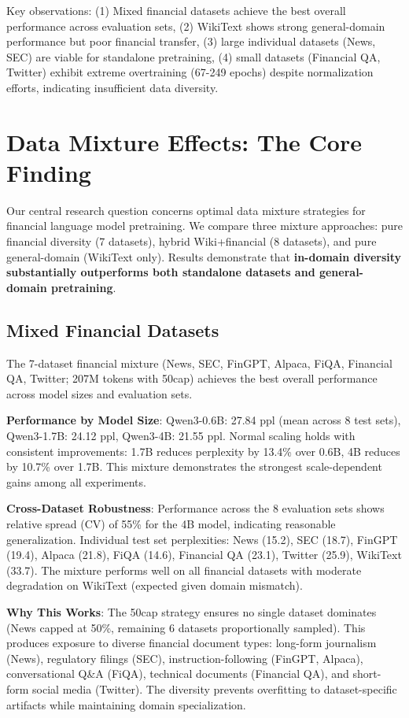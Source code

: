 Key observations: (1) Mixed financial datasets achieve the best overall performance across evaluation sets, (2) WikiText shows strong general-domain performance but poor financial transfer, (3) large individual datasets (News, SEC) are viable for standalone pretraining, (4) small datasets (Financial QA, Twitter) exhibit extreme overtraining (67-249 epochs) despite normalization efforts, indicating insufficient data diversity.

\section{Data Mixture Effects: The Core Finding}

Our central research question concerns optimal data mixture strategies for financial language model pretraining. We compare three mixture approaches: pure financial diversity (7 datasets), hybrid Wiki+financial (8 datasets), and pure general-domain (WikiText only). Results demonstrate that \textbf{in-domain diversity substantially outperforms both standalone datasets and general-domain pretraining}.

\subsection{Mixed Financial Datasets}

The 7-dataset financial mixture (News, SEC, FinGPT, Alpaca, FiQA, Financial QA, Twitter; 207M tokens with 50cap) achieves the best overall performance across model sizes and evaluation sets.

\textbf{Performance by Model Size}: Qwen3-0.6B: 27.84 ppl (mean across 8 test sets), Qwen3-1.7B: 24.12 ppl, Qwen3-4B: 21.55 ppl. Normal scaling holds with consistent improvements: 1.7B reduces perplexity by 13.4\% over 0.6B, 4B reduces by 10.7\% over 1.7B. This mixture demonstrates the strongest scale-dependent gains among all experiments.

\textbf{Cross-Dataset Robustness}: Performance across the 8 evaluation sets shows relative spread (CV) of 55\% for the 4B model, indicating reasonable generalization. Individual test set perplexities: News (15.2), SEC (18.7), FinGPT (19.4), Alpaca (21.8), FiQA (14.6), Financial QA (23.1), Twitter (25.9), WikiText (33.7). The mixture performs well on all financial datasets with moderate degradation on WikiText (expected given domain mismatch).

\textbf{Why This Works}: The 50cap strategy ensures no single dataset dominates (News capped at 50\%, remaining 6 datasets proportionally sampled). This produces exposure to diverse financial document types: long-form journalism (News), regulatory filings (SEC), instruction-following (FinGPT, Alpaca), conversational Q\&A (FiQA), technical documents (Financial QA), and short-form social media (Twitter). The diversity prevents overfitting to dataset-specific artifacts while maintaining domain specialization.

